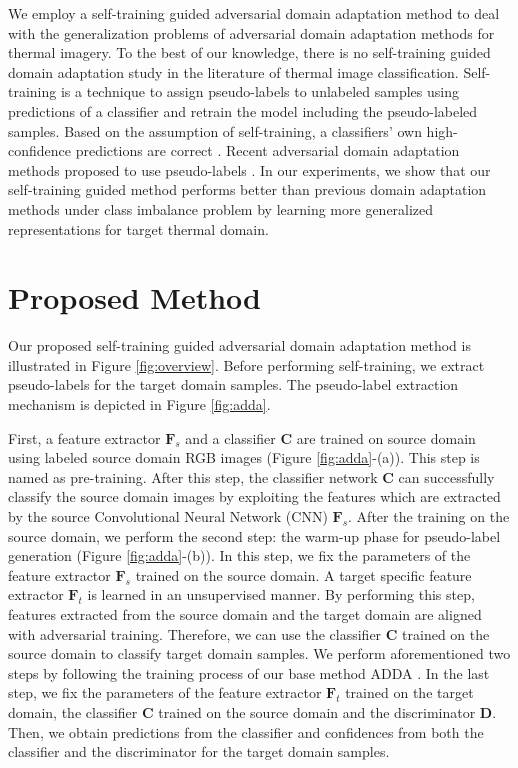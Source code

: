 \documentclass[final]{cvpr}
\begin{document}
We employ a self-training guided adversarial domain adaptation method to deal with the generalization problems of adversarial domain adaptation methods for thermal imagery. To the best of our knowledge, there is no self-training guided domain adaptation study in the literature of thermal image classification. Self-training is a technique to assign pseudo-labels to unlabeled samples using predictions of a classifier and retrain the model including the pseudo-labeled samples. Based on the assumption of self-training, a classifiers' own high-confidence predictions are correct \cite{zhu2005semi}. Recent adversarial domain adaptation methods proposed to use pseudo-labels \cite{saito2017asymmetric, xie2018learning, zhang2018collaborative}. In our experiments, we show that our self-training guided method performs better than previous domain adaptation methods under class imbalance problem by learning more generalized representations for target thermal domain.

\section{Proposed Method}
\label{sec:method}

Our proposed self-training guided adversarial domain adaptation method is illustrated in Figure \ref{fig:overview}. Before performing self-training, we extract pseudo-labels for the target domain samples. The pseudo-label extraction mechanism is depicted in Figure \ref{fig:adda}. 

First, a feature extractor $ \mathbf{F}_s $ and a classifier $ \mathbf{C} $ are trained on source domain using labeled source domain RGB images (Figure \ref{fig:adda}-(a)). This step is named as pre-training. After this step, the classifier network $ \mathbf{C} $ can successfully classify the source domain images by exploiting the features which are extracted by the source Convolutional Neural Network (CNN) $ \mathbf{F}_s $. After the training on the source domain, we perform the second step: the warm-up phase for pseudo-label generation (Figure \ref{fig:adda}-(b)). In this step, we fix the parameters of the feature extractor $ \mathbf{F}_s $ trained on the source domain. A target specific feature extractor $ \mathbf{F}_t $ is learned in an unsupervised manner. By performing this step, features extracted from the source domain and the target domain are aligned with adversarial training. Therefore, we can use the classifier $ \mathbf{C} $ trained on the source domain to classify target domain samples. We perform aforementioned two steps by following the training process of our base method ADDA \cite{adda}. In the last step, we fix the parameters of the feature extractor $ \mathbf{F}_t $ trained on the target domain, the classifier $ \mathbf{C} $ trained on the source domain and the discriminator $ \mathbf{D} $. Then, we obtain predictions from the classifier and confidences from both the classifier and the discriminator for the target domain samples.
\end{document}
